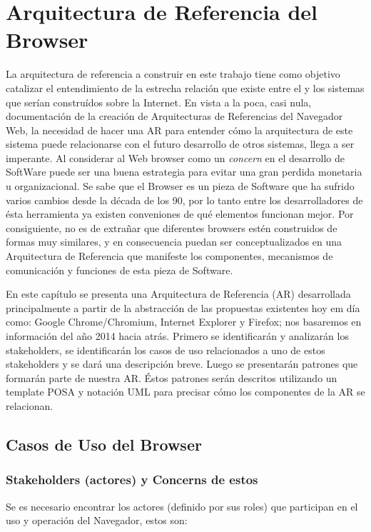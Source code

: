 \chapter{Arquitectura de Referencia del Browser}
\label{chap4:ArqRefBrowser}

La arquitectura de referencia a construir en este trabajo tiene como objetivo catalizar el entendimiento de la estrecha relación que existe entre el \cite{Web Browser} y los sistemas que serían construídos sobre la Internet. En vista a la poca, casi nula, documentación de la creación de Arquitecturas de Referencias del Navegador Web, la necesidad de hacer una AR para entender cómo la arquitectura de este sistema puede relacionarse con el futuro desarrollo de otros sistemas, llega a ser imperante. Al considerar al Web browser como un \textit{concern} en el desarrollo de SoftWare puede ser una buena estrategia para evitar una gran perdida monetaria u organizacional. Se sabe que el Browser es un pieza de Software que ha sufrido varios cambios desde la década de los 90, por lo tanto entre los desarrolladores de ésta herramienta ya existen conveniones de qué elementos funcionan mejor. Por consiguiente, no es de extrañar que diferentes browsers estén construidos de formas muy similares, y en consecuencia puedan ser conceptualizados en una Arquitectura de Referencia que manifeste los componentes, mecanismos de comunicación y funciones de esta pieza de Software.

En este capítulo se presenta una Arquitectura de Referencia (AR) desarrollada principalmente a partir de la abstracción de las propuestas existentes hoy em día como: Google Chrome/Chromium, Internet Explorer y Firefox; nos basaremos en información del año 2014 hacia atrás. Primero se identificarán y analizarán los stakeholders, se identificarán los casos de uso relacionados a uno de estos stakeholders y se dará una descripción breve. Luego se presentarán patrones que formarán parte de nuestra AR. Éstos patrones serán descritos utilizando un template POSA \cite{buschman1996system} y notación UML para precisar cómo los componentes de la AR se relacionan.


\section{Casos de Uso del Browser}
	\subsection{Stakeholders (actores) y Concerns de estos}
	Se es necesario encontrar los actores (definido por sus roles) que participan en el uso y operación del Navegador, estos son:
